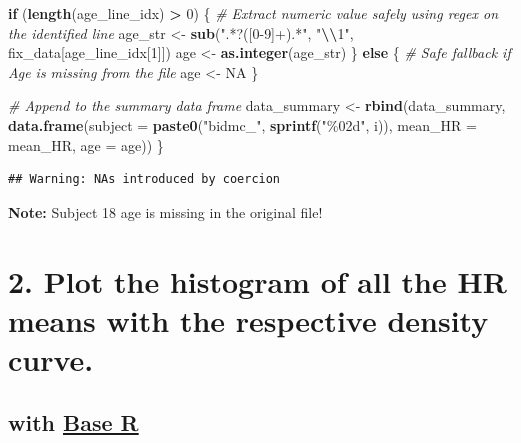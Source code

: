 \documentclass[
]{article}
\newenvironment{Shaded}{\begin{snugshade}}{\end{snugshade}}
\newcommand{\AttributeTok}[1]{\textcolor[rgb]{0.13,0.29,0.53}{#1}}
\newcommand{\CommentTok}[1]{\textcolor[rgb]{0.56,0.35,0.01}{\textit{#1}}}
\newcommand{\ConstantTok}[1]{\textcolor[rgb]{0.56,0.35,0.01}{#1}}
\newcommand{\ControlFlowTok}[1]{\textcolor[rgb]{0.13,0.29,0.53}{\textbf{#1}}}
\newcommand{\DecValTok}[1]{\textcolor[rgb]{0.00,0.00,0.81}{#1}}
\newcommand{\FunctionTok}[1]{\textcolor[rgb]{0.13,0.29,0.53}{\textbf{#1}}}
\newcommand{\NormalTok}[1]{#1}
\newcommand{\OtherTok}[1]{\textcolor[rgb]{0.56,0.35,0.01}{#1}}
\newcommand{\SpecialCharTok}[1]{\textcolor[rgb]{0.81,0.36,0.00}{\textbf{#1}}}
\newcommand{\StringTok}[1]{\textcolor[rgb]{0.31,0.60,0.02}{#1}}
\begin{document}
\begin{Shaded}
\begin{Highlighting}[]
  \ControlFlowTok{if}\NormalTok{ (}\FunctionTok{length}\NormalTok{(age\_line\_idx) }\SpecialCharTok{\textgreater{}} \DecValTok{0}\NormalTok{) \{}
    \CommentTok{\# Extract numeric value safely using regex on the identified line}
\NormalTok{    age\_str }\OtherTok{\textless{}{-}} \FunctionTok{sub}\NormalTok{(}\StringTok{".*?([0{-}9]+).*"}\NormalTok{, }\StringTok{"}\SpecialCharTok{\textbackslash{}\textbackslash{}}\StringTok{1"}\NormalTok{, fix\_data[age\_line\_idx[}\DecValTok{1}\NormalTok{]])}
\NormalTok{    age }\OtherTok{\textless{}{-}} \FunctionTok{as.integer}\NormalTok{(age\_str)}
\NormalTok{  \} }\ControlFlowTok{else}\NormalTok{ \{}
    \CommentTok{\# Safe fallback if Age is missing from the file}
\NormalTok{    age }\OtherTok{\textless{}{-}} \ConstantTok{NA} 
\NormalTok{  \}}
  
  \CommentTok{\# Append to the summary data frame}
\NormalTok{  data\_summary }\OtherTok{\textless{}{-}} \FunctionTok{rbind}\NormalTok{(data\_summary, }\FunctionTok{data.frame}\NormalTok{(}\AttributeTok{subject =} \FunctionTok{paste0}\NormalTok{(}\StringTok{"bidmc\_"}\NormalTok{,}
                                                        \FunctionTok{sprintf}\NormalTok{(}\StringTok{"\%02d"}\NormalTok{, i)),}
                                                        \AttributeTok{mean\_HR =}\NormalTok{ mean\_HR,}
                                                        \AttributeTok{age =}\NormalTok{ age))}
\NormalTok{\}}
\end{Highlighting}
\end{Shaded}

\begin{verbatim}
## Warning: NAs introduced by coercion
\end{verbatim}

\textbf{Note:} Subject 18 age is missing in the original file!

\section{2. Plot the histogram of all the HR means with the respective
density
curve.}\label{plot-the-histogram-of-all-the-hr-means-with-the-respective-density-curve.}

\subsection{\texorpdfstring{with \ul{Base
R}}{with Base R}}\label{with-base-r}
\end{document}
